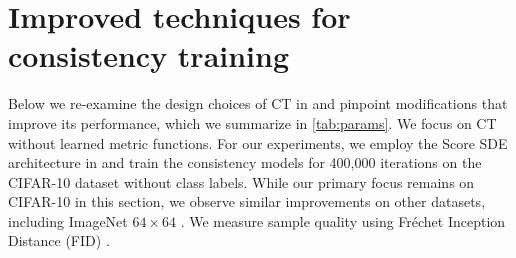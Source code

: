 \section{Improved techniques for consistency training}\label{sec:method}

Below we re-examine the design choices of CT in \citet{song2023consistency} and pinpoint modifications that improve its performance, which we summarize in \cref{tab:params}. We focus on CT without learned metric functions. For our experiments, we employ the Score SDE architecture in \citet{song2021scorebased} and train the consistency models for 400,000 iterations on the CIFAR-10 dataset \citep{krizhevsky2014cifar} without class labels. While our primary focus remains on CIFAR-10 in this section, we observe similar improvements on other datasets, including ImageNet $64\times 64$ \citep{deng2009imagenet}. We measure sample quality using Fr\'echet Inception Distance (FID) \citep{heusel2017gans}.




